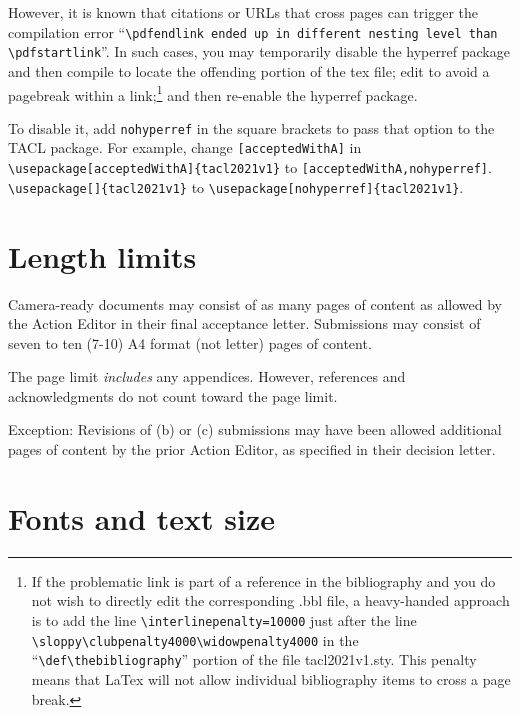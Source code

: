 \documentclass[11pt,a4paper]{article}
\newcommand{\styleFileVersion}{tacl2021v1}
\begin{document}
However, it is known that citations or URLs that cross pages can trigger the
compilation error ``{\tt {\textbackslash}pdfendlink ended up in different nesting
level than {\textbackslash}pdfstartlink}''.  In such cases, you may temporarily
disable the hyperref package and then compile to locate the offending portion of
the tex file; edit to avoid a pagebreak within a link;\footnote{If the problematic
link is part of a reference in the bibliography and you do not wish to
directly edit the corresponding .bbl file, a heavy-handed approach is to
add the line
{\tt \textbackslash interlinepenalty=10000}
just after the line
{\tt \textbackslash sloppy\textbackslash clubpenalty4000\textbackslash widowpenalty4000} in the
``{\tt \textbackslash def\textbackslash thebibliography}'' portion
of the file \styleFileVersion.sty.  This penalty means that LaTex will not allow
individual bibliography items to cross a page break.
}
 and then re-enable the
hyperref package.

To disable it,
add {\tt nohyperref} in the square brackets to pass that option to the TACL package.
For example, change
\iftaclpubformat
\verb+[acceptedWithA]+ in
{\footnotesize {\tt {\textbackslash usepackage}[acceptedWithA]\{\styleFileVersion\}}}
to
\verb+[acceptedWithA,nohyperref]+.
\else
{\tt {\textbackslash usepackage}[]\{\styleFileVersion\}}
to
{\tt {\textbackslash usepackage}[nohyperref]\{\styleFileVersion\}}.
\fi



\section{Length limits}
\label{sec:length}

\iftaclpubformat
Camera-ready documents may consist of as many pages of content as allowed by
the Action Editor in their final acceptance letter.
\else
Submissions may consist of seven to ten (7-10) A4 format (not letter) pages of
content.
\fi

The page limit \emph{includes} any appendices. However, references
\iftaclpubformat
and acknowledgments
\fi
do not count
toward the page limit.

\iftaclpubformat
\else
Exception: Revisions of (b) or (c) submissions may have been allowed
additional pages of content by the prior Action Editor, as specified in their
decision letter.
\fi

\section{Fonts and text size}
\end{document}
